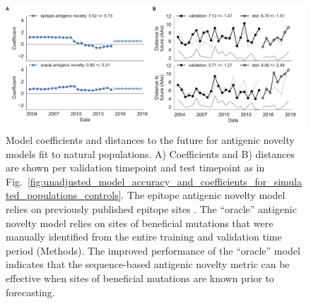 \begin{figure}[H]
  \begin{center}
  \includegraphics[width=\textwidth]{figures/unadjusted-composite-model-accuracy-and-coefficients-for-natural-populations-epitope-vs-oracle.pdf}
  \caption{
  Model coefficients and distances to the future for antigenic novelty models fit to natural populations.
  A) Coefficients and B) distances are shown per validation timepoint and test timepoint as in Fig.~\ref{fig:unadjusted_model_accuracy_and_coefficients_for_simulated_populations_controls}.
  The epitope antigenic novelty model relies on previously published epitope sites \cite{Luksza:2014hj}.
  The ``oracle'' antigenic novelty model relies on sites of beneficial mutations that were manually identified from the entire training and validation time period (Methods).
  The improved performance of the ``oracle'' model indicates that the sequence-based antigenic novelty metric can be effective when sites of beneficial mutations are known prior to forecasting.
  }
  \label{sup_fig:unadjusted_composite_model_accuracy_and_coefficients_for_natural_populations_epitope_vs_oracle}
  \end{center}
\end{figure}

